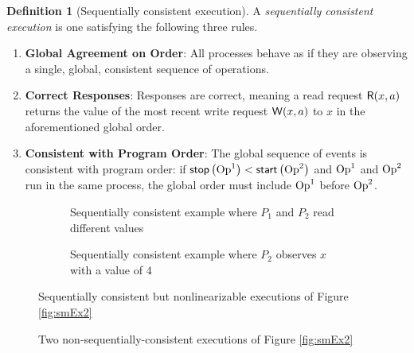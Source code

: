 \documentclass[]             %
{NASA}                       %
\theoremstyle{definition}
\newtheorem{definition}[theorem]{Definition}
\providecommand{\tightlist}{%
  \setlength{\itemsep}{0pt}\setlength{\parskip}{0pt}}
\begin{document}
\begin{definition}[Sequentially consistent execution]
  \label{def:sequentially-consistent-execution}
  A \emph{sequentially consistent execution} is one satisfying the following three rules.
\begin{enumerate}
  \tightlist
\item \textbf{Global Agreement on Order}: All processes behave as if
  they are observing a single, global, consistent sequence of
  operations.
\item \textbf{Correct Responses}: Responses are correct, meaning a read request
  \(\mathsf{R}\!\left(x, a\right)\) returns the value of the most recent write request
  \(\mathsf{W}\!\left(x, a\right)\) to \(x\) in the aforementioned global order.
\item \textbf{Consistent with Program Order}: The global sequence of
  events is consistent with program order: if
  $\mathsf{stop}\left(\mathrm{Op}^1\right) < \mathsf{start}\left(\mathrm{Op}^2\right)$ and $\mathrm{Op}^1$ and $\mathrm{Op}^2$ run in
  the same process, the global order must include $\mathrm{Op}^1$ before
  $\mathrm{Op}^2$.
\end{enumerate}
\end{definition}

\begin{figure}[p]
  \begin{subfigure}{1\textwidth}
    \centering
    
    \caption{Sequentially consistent example where $P_1$ and $P_2$ read different values}
    \label{fig:smEx4-a}
  \end{subfigure}
  \begin{subfigure}{1\textwidth}
    
    \caption{Sequentially consistent example where $P_2$ observes $x$ with a value of $4$}
    \label{fig:smEx4-b}
  \end{subfigure}
  \caption{Sequentially consistent but nonlinearizable executions of Figure \ref{fig:smEx2}}
  \label{fig:smEx4}
\end{figure}
\begin{figure}[p]
  \begin{subfigure}{1\textwidth}
    \centering
    
    \caption{}
    \label{fig:smEx4L2}
  \end{subfigure}
  \begin{subfigure}{1\textwidth}
    
    \caption{}
    \label{fig:smEx4S2}
  \end{subfigure}
  \caption{Two non-sequentially-consistent executions of Figure \ref{fig:smEx2}}
  \label{fig:smEx4-alt}
\end{figure}
\end{document}

